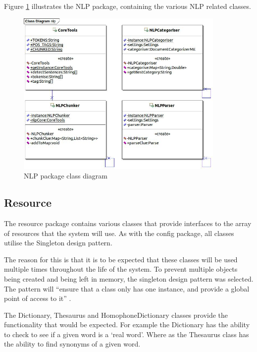 
Figure \ref{fig:nlp_package} illustrates the NLP package, containing the 
various NLP related classes.

\begin{figure}[H]
  \centering
  \includegraphics[width=0.9\textwidth]{class/nlp.jpg}
  \caption{NLP package class diagram}
  \label{fig:nlp_package}
\end{figure}


\subsection{Resource}
\label{sub:resource}

The resource package contains various classes that provide interfaces to the 
array of resources that the system will use. As with the config package, all 
classes utilise the Singleton design pattern. 

The reason for this is that it is to be expected that these classes will be used
multiple times throughout the life of the system. To prevent multiple objects 
being created and being left in memory, the singleton design pattern was 
selected. The pattern will ``ensure that a class only has one instance, and 
provide a global point of access to it'' \citep{gof}.

The Dictionary, Thesaurus and HomophoneDictionary classes provide the 
functionality that would be expected. For example the Dictionary has the ability
to check to see if a given word is a `real word'. Where as the Thesaurus class
has the ability to find synonyms of a given word.

